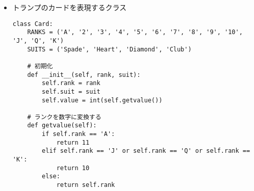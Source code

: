 \begin{itemize}
\item トランプのカードを表現するクラス
\begin{lstlisting}
class Card:
    RANKS = ('A', '2', '3', '4', '5', '6', '7', '8', '9', '10', 'J', 'Q', 'K')
    SUITS = ('Spade', 'Heart', 'Diamond', 'Club')

    # 初期化
    def __init__(self, rank, suit):
        self.rank = rank
        self.suit = suit
        self.value = int(self.getvalue())

    # ランクを数字に変換する
    def getvalue(self):
        if self.rank == 'A':
            return 11
        elif self.rank == 'J' or self.rank == 'Q' or self.rank == 'K':
            return 10
        else:
            return self.rank
\end{lstlisting}
\end{itemize}
\newpage